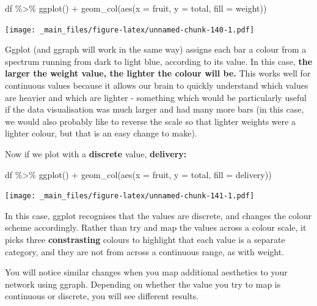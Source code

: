 \documentclass[
]{book}
\newenvironment{Shaded}{\begin{snugshade}}{\end{snugshade}}
\newcommand{\AttributeTok}[1]{\textcolor[rgb]{0.77,0.63,0.00}{#1}}
\newcommand{\FunctionTok}[1]{\textcolor[rgb]{0.00,0.00,0.00}{#1}}
\newcommand{\NormalTok}[1]{#1}
\newcommand{\SpecialCharTok}[1]{\textcolor[rgb]{0.00,0.00,0.00}{#1}}
\begin{document}
\begin{Shaded}
\begin{Highlighting}[]
\NormalTok{df }\SpecialCharTok{\%\textgreater{}\%} \FunctionTok{ggplot}\NormalTok{() }\SpecialCharTok{+} \FunctionTok{geom\_col}\NormalTok{(}\FunctionTok{aes}\NormalTok{(}\AttributeTok{x =}\NormalTok{ fruit, }\AttributeTok{y =}\NormalTok{ total, }\AttributeTok{fill =}\NormalTok{ weight))}
\end{Highlighting}
\end{Shaded}

\texttt{[image: \_main\_files/figure-latex/unnamed-chunk-140-1.pdf]}

Ggplot (and ggraph will work in the same way) assigns each bar a colour from a spectrum running from dark to light blue, according to its value. In this case, \textbf{the larger the weight value, the lighter the colour will be.} This works well for continuous values because it allows our brain to quickly understand which values are heavier and which are lighter - something which would be particularly useful if the data visualisation was much larger and had many more bars (in this case, we would also probably like to reverse the scale so that lighter weights were a lighter colour, but that is an easy change to make).

Now if we plot with a \textbf{discrete} value, \textbf{delivery:}

\begin{Shaded}
\begin{Highlighting}[]
\NormalTok{df }\SpecialCharTok{\%\textgreater{}\%} \FunctionTok{ggplot}\NormalTok{() }\SpecialCharTok{+} \FunctionTok{geom\_col}\NormalTok{(}\FunctionTok{aes}\NormalTok{(}\AttributeTok{x =}\NormalTok{ fruit, }\AttributeTok{y =}\NormalTok{ total, }\AttributeTok{fill =}\NormalTok{ delivery))}
\end{Highlighting}
\end{Shaded}

\texttt{[image: \_main\_files/figure-latex/unnamed-chunk-141-1.pdf]}

In this case, ggplot recognises that the values are discrete, and changes the colour scheme accordingly. Rather than try and map the values across a colour scale, it picks three \textbf{constrasting} colours to highlight that each value is a separate category, and they are not from across a continuous range, as with weight.

You will notice similar changes when you map additional aesthetics to your network using ggraph. Depending on whether the value you try to map is continuous or discrete, you will see different results.
\end{document}
